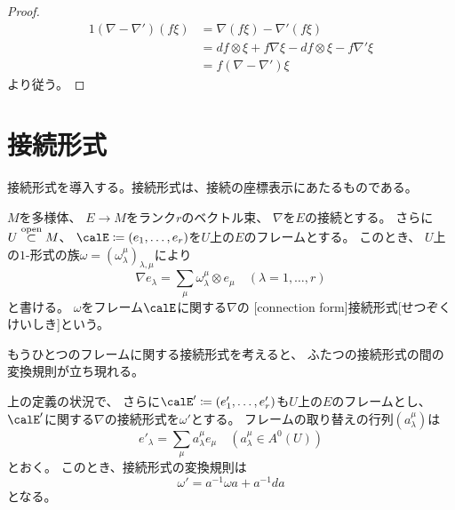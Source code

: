 \documentclass[report]{jlreq}
\begin{document}
\begin{proof}
    \begin{alignat}{1}
        (\nabla - \nabla')(f\xi)
            &= \nabla(f\xi) - \nabla'(f\xi) \\
            &= df \otimes \xi + f \nabla\xi - df \otimes \xi - f \nabla'\xi \\
            &= f (\nabla - \nabla')\xi
    \end{alignat}
    より従う。
\end{proof}

%
\section{接続形式}

接続形式を導入する。接続形式は、接続の座標表示にあたるものである。

\begin{definition}[接続形式]
    $M$を多様体、
    $E \to M$をランク$r$のベクトル束、
    $\nabla$を$E$の接続とする。
    さらに$U \stackrel{\text{open}}{\subset} M$、
    $\calE \coloneqq (e_1, \dots, e_r)$を$U$上の$E$のフレームとする。
    このとき、
    $U$上の$1$-形式の族$\omega = (\omega_\lambda^\mu)_{\lambda, \mu}$により
    \begin{equation}
        \nabla e_\lambda
            = \sum_{\mu} \omega_\lambda^\mu \otimes e_\mu
            \quad (\lambda = 1, \dots, r)
    \end{equation}
    と書ける。
    $\omega$をフレーム$\calE$に関する$\nabla$の
    [connection form]{接続形式}[せつぞくけいしき]という。
\end{definition}

もうひとつのフレームに関する接続形式を考えると、
ふたつの接続形式の間の変換規則が立ち現れる。

\begin{proposition}[接続形式の変換規則]
    上の定義の状況で、
    さらに$\calE' \coloneqq (e'_1, \dots, e'_r)$も$U$上の$E$のフレームとし、
    $\calE'$に関する$\nabla$の接続形式を$\omega'$とする。
    フレームの取り替えの行列$(a_\lambda^\mu)$は
    \begin{equation}
        e'_\lambda = \sum_{\mu} a_\lambda^\mu e_\mu
        \quad (a_\lambda^\mu \in A^0(U))
    \end{equation}
    とおく。
    このとき、接続形式の変換規則は
    \begin{equation}
        \omega' = a^{-1} \omega a + a^{-1} da
    \end{equation}
    となる。
\end{proposition}
\end{document}
